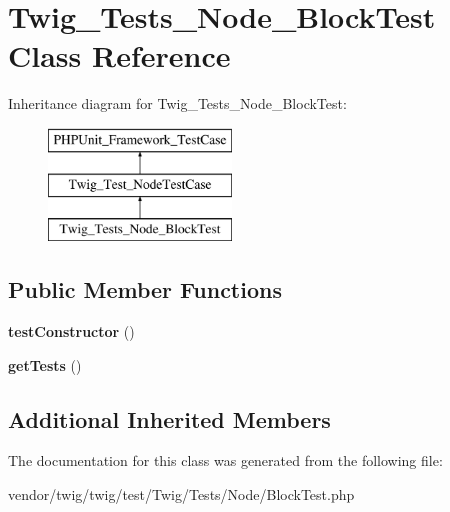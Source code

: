 \hypertarget{classTwig__Tests__Node__BlockTest}{}\section{Twig\+\_\+\+Tests\+\_\+\+Node\+\_\+\+Block\+Test Class Reference}
\label{classTwig__Tests__Node__BlockTest}
Inheritance diagram for Twig\+\_\+\+Tests\+\_\+\+Node\+\_\+\+Block\+Test\+:\begin{figure}[H]
\begin{center}
\leavevmode
\includegraphics[height=3.000000cm]{classTwig__Tests__Node__BlockTest}
\end{center}
\end{figure}
\subsection*{Public Member Functions}
\begin{DoxyCompactItemize}
\item 
{\bfseries test\+Constructor} ()\hypertarget{classTwig__Tests__Node__BlockTest_aec211ec9f07b2e80e981ea31a6741e00}{}\label{classTwig__Tests__Node__BlockTest_aec211ec9f07b2e80e981ea31a6741e00}

\item 
{\bfseries get\+Tests} ()\hypertarget{classTwig__Tests__Node__BlockTest_ab93acd517d761e3e1886fc1fb1ab1b89}{}\label{classTwig__Tests__Node__BlockTest_ab93acd517d761e3e1886fc1fb1ab1b89}

\end{DoxyCompactItemize}
\subsection*{Additional Inherited Members}


The documentation for this class was generated from the following file\+:\begin{DoxyCompactItemize}
\item 
vendor/twig/twig/test/\+Twig/\+Tests/\+Node/Block\+Test.\+php\end{DoxyCompactItemize}
